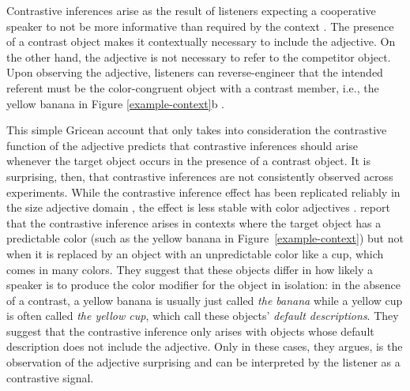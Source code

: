 \documentclass[10pt,letterpaper]{article}
\newcommand{\ek}[1]{\textcolor{Orange}{[ek: #1]}}
\newcommand{\figref}[1]{Figure \ref{#1}}
\begin{document}

Contrastive inferences arise as the result of listeners expecting a cooperative speaker to not be more informative than required by the context \cite{Grice:1975}. The presence of a contrast object makes it contextually necessary to include the adjective. On the other hand, the adjective is not necessary to refer to the competitor object. Upon observing the adjective, listeners can reverse-engineer that the intended referent must be the color-congruent object with a contrast member, i.e., the yellow banana in \figref{example-context}b \cite{Aparicio:2016,Aparicio:2018,Grodner:2005,Grodner:2011,Ryskin:2019,Sedivy:1999}.

This simple Gricean account that only takes into consideration the contrastive function of the adjective predicts that contrastive inferences should arise whenever the target object occurs in the presence of a contrast object. It is surprising, then, that contrastive inferences are not consistently observed across experiments. While the contrastive inference effect has been replicated reliably in the size adjective domain \cite{Aparicio:2016,Aparicio:2018,Grodner:2011,Ryskin:2019,Sedivy:1999}, the effect is less stable with color adjectives \cite{Sedivy:2003}.  report that the contrastive inference arises in contexts where the target object has a predictable color (such as the yellow banana in Figure~\ref{example-context}) but not when it is replaced by an object with an unpredictable color like a cup, which comes in many colors.
They suggest that these objects differ in how likely a speaker is to produce the color modifier for the object in isolation: in the absence of a contrast, a yellow banana is usually just called \textit{the banana} while a yellow cup is often called \textit{the yellow cup}, which  call these objects' \emph{default descriptions}. They suggest that the contrastive inference only arises with objects whose default description does not include the adjective. Only in these cases, they argues, is the observation of the adjective surprising and can be interpreted by the listener as a contrastive signal.
\end{document}

